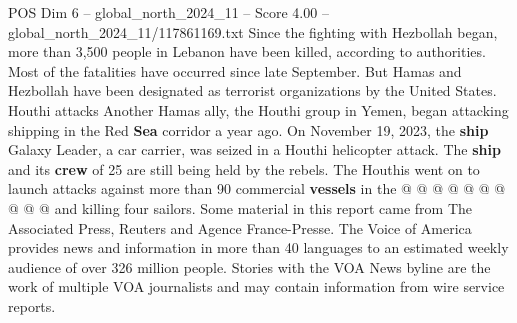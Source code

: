 \begin{textsample}{POS Dim 6 – global\_north\_2024\_11 – Score 4.00 – global\_north\_2024\_11/117861169.txt}
Since the fighting with Hezbollah began, more than 3,500 people in Lebanon have been killed, according to authorities.
Most of the fatalities have occurred since late September.
But Hamas and Hezbollah have been designated as terrorist organizations by the United States.
Houthi attacks Another Hamas ally, the Houthi group in Yemen, began attacking shipping in the Red \textbf{Sea} corridor a year ago.
On November 19, 2023, the \textbf{ship} Galaxy Leader, a car carrier, was seized in a Houthi helicopter attack.
The \textbf{ship} and its \textbf{crew} of 25 are still being held by the rebels.
The Houthis went on to launch attacks against more than 90 commercial \textbf{vessels} in the @ @ @ @ @ @ @ @ @ @ and killing four sailors.
Some material in this report came from The Associated Press, Reuters and Agence France-Presse.
The Voice of America provides news and information in more than 40 languages to an estimated weekly audience of over 326 million people.
Stories with the VOA News byline are the work of multiple VOA journalists and may contain information from wire service reports.

\end{textsample}
